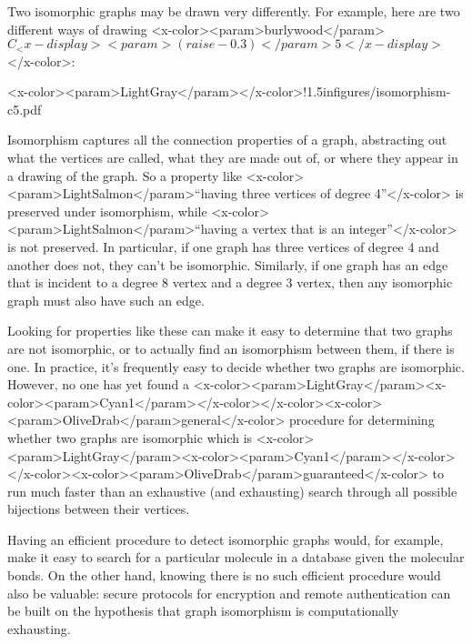 {Two isomorphic graphs may be drawn very differently.  For example, here
are two different ways of drawing <x-color><param>burlywood</param>$C_<x-display><param>(raise -0.3)</param>5</x-display>$</x-color>:

<x-color><param>LightGray</param>\mfigure</x-color>{!}{1.5in}{figures/isomorphism-c5.pdf}

Isomorphism captures all the connection properties of a graph, abstracting
out what the vertices are called, what they are made out of, or where they
appear in a drawing of the graph.  So a property like <x-color><param>LightSalmon</param>``having three
vertices of degree 4''</x-color> is preserved under isomorphism, while <x-color><param>LightSalmon</param>``having a
vertex that is an integer''</x-color> is not preserved.  In particular, if one graph
has three vertices of degree 4 and another does not, they can't be
isomorphic.  Similarly, if one graph has an edge that is incident to
a degree 8 vertex and a degree 3 vertex, then any isomorphic graph must also
have such an edge.

Looking for properties like these can make it easy to determine that two
graphs are not isomorphic, or to actually find an isomorphism between
them, if there is one.  In practice, it's frequently easy to decide
whether two graphs are isomorphic.  However, no one has yet found a
<x-color><param>LightGray</param><x-color><param>Cyan1</param>\emph</x-color></x-color><x-color><param>OliveDrab</param>{general}</x-color> procedure for determining whether two graphs are isomorphic
which is <x-color><param>LightGray</param><x-color><param>Cyan1</param>\emph</x-color></x-color><x-color><param>OliveDrab</param>{guaranteed}</x-color> to run much faster than an exhaustive (and
exhausting) search through all possible bijections between their
vertices.

Having an efficient procedure to detect isomorphic graphs would, for
example, make it easy to search for a particular molecule in a database
given the molecular bonds.  On the other hand, knowing there is no such
efficient procedure would also be valuable: secure protocols for
encryption and remote authentication can be built on the hypothesis that
graph isomorphism is computationally exhausting.

}
